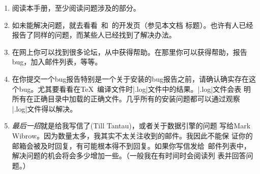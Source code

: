 \begin{enumerate}
\item
  阅读本手册，至少阅读问题涉及的部分。
\item
  如未能解决问题，就去看看\pgfname\ 和\tikzname\ 的开发页（参见本文档
标题）。也许有人已经报告了同样的问题，而某些人已经找到了解决办法。
\item
  在网上你可以找到很多论坛，从中获得帮助。在那里你可以获得帮助，报告
bug，加入邮件列表，等等。
\item
  在你提交一个bug报告特别是一个关于安装的bug报告之前，请确认确实存在这
个bug。尤其要看看在\TeX\ 编译文件时|.log|文件中的结果。|.log|文件会表
明所有在正确目录中加载的正确文件。几乎所有的安装问题都可以通过观察
|.log|文件得以解决。
\item
  \emph{最后一招}就是给我写信了(Till Tantau)，或者关于数据引擎的问题
写给Mark Wibrow。因为数量太多，我其实不太关注收到的邮件。我因此不能保
证你的邮箱会被及时回复，有可能根本得不到回复。如果你写信发给\pgfname\
邮件列表中，解决问题的机会将会多少增加一些。（一般我在有时间时会阅读列
表并回答问题。）
\end{enumerate}

